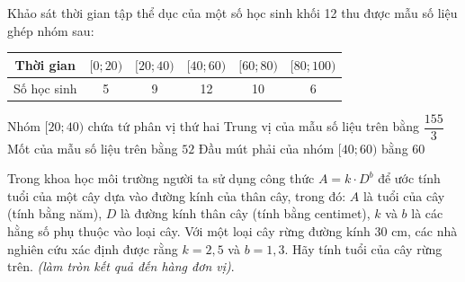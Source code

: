 \begin{ex}%
	Khảo sát thời gian tập thể dục của một số học sinh khối 12 thu được mẫu số liệu ghép nhóm sau:
	\begin{center}
		\begin{tabular}{|c|c|c|c|c|c|}
			\hline
			Thời gian & $[0;20)$ & $[20;40)$ & $[40;60)$ & $[60;80)$ & $[80;100)$ \\
			\hline
			Số học sinh & 5 & 9 & 12 & 10 & 6 \\
			\hline
		\end{tabular}
	\end{center}
	\choiceTF
	{Nhóm $[20;40)$ chứa tứ phân vị thứ hai}
	{\True Trung vị của mẫu số liệu trên bằng $\dfrac{155}{3}$}
	{\True Mốt của mẫu số liệu trên bằng $52$}
	{\True Đầu mút phải của nhóm $[40;60)$ bằng $60$}
	\loigiai{
		\begin{itemchoice}
			\itemch Ta có $n=5+9+12+10+6=42$ và $\dfrac{42+1}{2} = 21{,}5$ nên $Q_2\in [40;60)$.
			\itemch Trung vị là $Q_2=40+\dfrac{\frac{42}{2}-14}{12}\cdot 20 = \dfrac{155}{3}$.
			\itemch Vì $M_0 \in [40;60)$ nên $M_0 = 40 + \dfrac{12-9}{(12-9)+(12-10)}\cdot 20 = 52$.
			\itemch Đầu mút phải của nhóm $[40;60)$ bằng $60$.
		\end{itemchoice}
	}
\end{ex}

\begin{ex}%
	Trong khoa học môi trường người ta sử dụng công thức $A=k\cdot D^b$ để ước tính tuổi của một cây dựa vào đường kính của thân cây, trong đó: $A$ là tuổi của cây (tính bằng năm), $D$ là đường kính thân cây (tính bằng centimet), $k$ và $b$ là các hằng số phụ thuộc vào loại cây. Với một loại cây rừng đường kính $30$ cm, các nhà nghiên cứu xác định được rằng $k=2,5$ và $b=1,3$. Hãy tính tuổi của cây rừng trên. {\it (làm tròn kết quả đến hàng đơn vị)}.
\end{ex}

